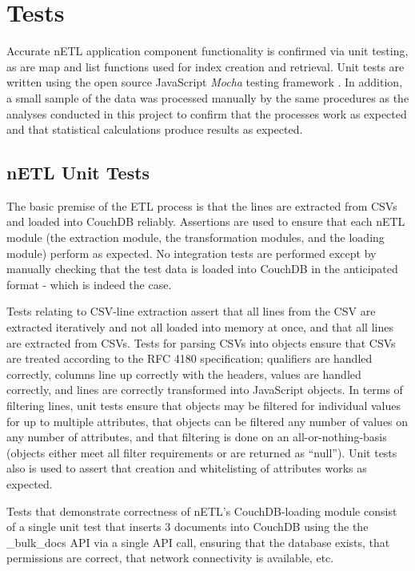 \section{Tests}
Accurate nETL application component functionality is confirmed via unit testing, as are map and list functions used for index creation and retrieval. Unit tests are written using the open source JavaScript \textit{Mocha} testing framework \cite{mochaTest}. In addition, a small sample of the data was processed manually by the same procedures as the analyses conducted in this project to confirm that the processes work as expected and that statistical calculations produce results as expected.

\subsection{nETL Unit Tests}
The basic premise of the ETL process is that the lines are extracted from CSVs and loaded into CouchDB reliably. Assertions are used to ensure that each nETL module (the extraction module, the transformation modules, and the loading module) perform as expected. No integration tests are performed except by manually checking that the test data is loaded into CouchDB in the anticipated format - which is indeed the case.

Tests relating to CSV-line extraction assert that all lines from the CSV are extracted iteratively and not all loaded into memory at once, and that all lines are extracted from CSVs. Tests for parsing CSVs into objects ensure that CSVs are treated according to the RFC 4180 specification; qualifiers are handled correctly, columns line up correctly with the headers, values are handled correctly, and lines are correctly transformed into JavaScript objects. In terms of filtering lines, unit tests ensure that objects may be filtered for individual values for up to multiple attributes, that objects can be filtered any number of values on any number of attributes, and that filtering is done on an all-or-nothing-basis (objects either meet all filter requirements or are returned as ``null''). Unit tests also is used to assert that creation and whitelisting of attributes works as expected.

Tests that demonstrate correctness of nETL's CouchDB-loading module consist of a single unit test that inserts 3 documents into CouchDB using the the \_bulk\_docs API via a single API call, ensuring that the database exists, that permissions are correct, that network connectivity is available, etc.

